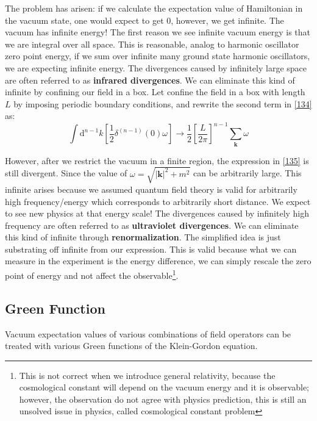 \documentclass[12pt]{article}
\numberwithin{equation}{section}
\theoremstyle{1style}
\newcommand{\tbf}[1]{\textbf{#1}}
\newcommand{\id}{\mathrm{d}}
\begin{document}
The problem has arisen: if we calculate the expectation value of Hamiltonian in the vacuum state, one would expect to get 0,
however, we get infinite.
The vacuum has infinite energy!
The first reason we see infinite vacuum energy is that we are integral over all space. This is reasonable, analog
to harmonic oscillator zero point energy,
if we sum over infinite many ground state harmonic oscillators, we are expecting infinite energy.
The divergences caused by infinitely large space are often referred to as \tbf{infrared divergences}.
We can eliminate this kind of infinite by confining our field in a box.
Let confine the field in a box with length \(L\) by imposing periodic boundary conditions, and rewrite the second term in \ref{134} as:
\begin{equation}\label{135}
  \int \id^{n-1}k\left[\frac{1}{2}\delta^{(n-1)}(0)\omega\right]\rightarrow\frac{1}{2}\left[\frac{L}{2\pi}\right]^{n-1}\sum_{\mathbf{k}}\omega
\end{equation}

However, after we restrict the vacuum in a finite region, the expression in \ref{135} is still divergent.
Since the value of \(\omega=\sqrt{|\mathbf{k}|^2+m^2}\) can be arbitrarily large.
This infinite arises because we assumed quantum field theory is valid for arbitrarily high frequency/energy
which corresponds to arbitrarily short distance. We expect to see new physics at that energy scale!
The divergences caused by infinitely high frequency are often referred to as \tbf{ultraviolet divergences}.
We can eliminate this kind of infinite through \tbf{renormalization}.
The simplified idea is just substrating off infinite from our expression.
This is valid because what we can measure in the experiment is the energy difference,
we can simply rescale the zero point of energy and not affect the observable\footnote{This is not correct when we introduce general relativity, 
because the cosmological constant will depend on the vacuum energy and it is observable; however, 
the observation do not agree with physics prediction,
this is still an unsolved issue in physics, called cosmological constant problem}.





\subsection{Green Function}
Vacuum expectation values of various combinations of field operators can be treated with various Green functions of the Klein-Gordon equation.
\end{document}
